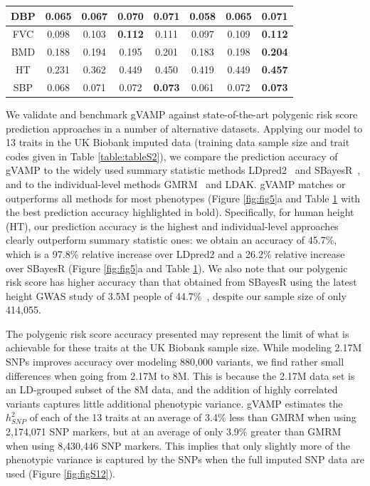 \begin{table}[!ht]
\begin{center}
{\begin{tabular}{|| c || c || c || c || c || c | c | c ||}
 \hline
DBP & 0.065 & 0.067 & 0.070 & \textbf{0.071} & 0.058 & 0.065 & \textbf{0.071} \\
 \hline
FVC & 0.098 & 0.103 & \textbf{0.112} & 0.111 & 0.097 & 0.109 & \textbf{0.112} \\
 \hline 
BMD & 0.188 & 0.194 & 0.195 & 0.201 & 0.183 & 0.198 & \textbf{0.204} \\
 \hline
HT & 0.231 & 0.362 & 0.449 & 0.450 & 0.419 & 0.449 & \textbf{0.457} \\
 \hline
SBP & 0.068 & 0.071 & 0.072 & \textbf{0.073} & 0.061 & 0.072 & \textbf{0.073} \\
\hline\hline
\end{tabular}
}
\end{center}
\label{table:table1}
\end{table}

We validate and benchmark gVAMP against state-of-the-art polygenic risk score prediction approaches in a number of alternative datasets. Applying our model to 13 traits in the UK Biobank imputed data (training data sample size and trait codes given in Table \ref{table:tableS2}), we compare the prediction accuracy of gVAMP to the widely used summary statistic methods LDpred2~\cite{ldpred} and SBayesR~\cite{sbayesr}, and to the individual-level methods GMRM~\cite{Orliac2022} and LDAK\cite{hof2024ldak}. gVAMP matches or outperforms all methods for most phenotypes (Figure \ref{fig:fig5}a and Table \ref{table:table1} with the best prediction accuracy highlighted in bold). Specifically, for human height (HT), our prediction accuracy is the highest and individual-level approaches clearly outperform summary statistic ones: we obtain an accuracy of 45.7\%, which is a 97.8\% relative increase over LDpred2 and a 26.2\% relative increase over SBayesR (Figure \ref{fig:fig5}a and Table \ref{table:table1}). We also note that our polygenic risk score has higher accuracy than that obtained from SBayesR using the latest height GWAS study of 3.5M people of 44.7\%~\cite{HTbig}, despite our sample size of only 414,055.

The polygenic risk score accuracy presented may represent the limit of what is achievable for these traits at the UK Biobank sample size. While modeling 2.17M SNPs improves accuracy over modeling 880,000 variants, we find rather small differences when going from 2.17M to 8M. This is because the 2.17M data set is an LD-grouped subset of the 8M data, and the addition of highly correlated variants captures little additional phenotypic variance. gVAMP estimates the $h^{2}_{SNP}$ of each of the 13 traits at an average of 3.4\% less than GMRM when using 2,174,071 SNP markers, but at an average of only 3.9\% greater than GMRM when using 8,430,446 SNP markers. This implies that only slightly more of the phenotypic variance is captured by the SNPs when the full imputed SNP data are used (Figure \ref{fig:figS12}). 

